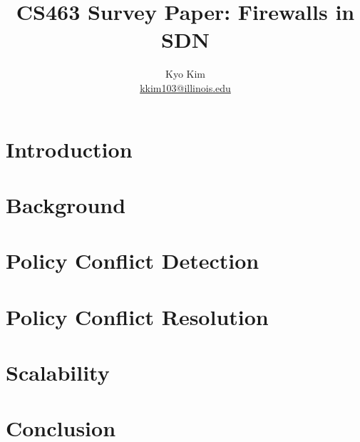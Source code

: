 \documentclass{article}
\title{\vspace{-3.0cm} CS463 Survey Paper: Firewalls in SDN}
\author{Kyo Kim \\
\href{mailto:kkim103@illinois.edu}{kkim103@illinois.edu}}
\date{}
\begin{document}
\maketitle

\begin{multicols}{2}



\begin{abstract}

\end{abstract}


\section{Introduction}


\section{Background}


\section{Policy Conflict Detection}

\section{Policy Conflict Resolution}

\section{Scalability}

\section{Conclusion}


\end{multicols}
\end{document}
